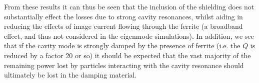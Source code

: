 From these results it can thus be seen that the inclusion of the shielding does not substantially effect the losses due to strong cavity resonances, whilst aiding in reducing the effects of image current flowing through the ferrite (a broadband effect, and thus not considered in the eigenmode simulations). In addition, we see that if the cavity mode is strongly damped by the presence of ferrite (i.e. the $Q$ is reduced by a factor 20 or so) it should be expected that the vast majority of the remaining power lost by particles interacting with the cavity resonance should ultimately be lost in the damping material. 